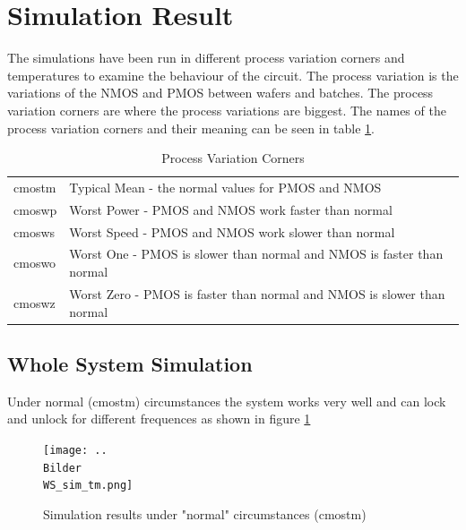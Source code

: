 \documentclass[a4paper,12pt]{article} \usepackage{graphicx}
\begin{document}
\clearpage
\section{Simulation Result}
The simulations have been run in different process variation corners and
temperatures to examine the behaviour of the circuit. The process variation is
the variations of the NMOS and PMOS between wafers and batches. 
The process variation corners are where the process variations are biggest.
The names of the process variation corners and their meaning can be seen in
table \ref{tab:corners}.

\begin{table}[h]
        \centering
        \begin{tabular}{|l|l|}
                \hline 
                cmostm & Typical Mean - the normal values for PMOS and NMOS \\
                cmoswp & Worst Power - PMOS and NMOS work faster than normal \\
                cmosws & Worst Speed - PMOS and NMOS work slower than normal \\
                cmoswo & Worst One - PMOS is slower than normal and NMOS is
                faster than normal \\
                cmoswz & Worst Zero - PMOS is faster than normal and NMOS is
                slower than normal \\
                \hline
        \end{tabular}
        \caption{Process Variation Corners}
        \label{tab:corners}
\end{table}

\subsection{Whole System Simulation}
Under normal (cmostm) circumstances the system works very well and can
lock and unlock for different frequences as shown in figure \ref{fig:WS_sim_tm} 

\begin{figure}[h]
  \centering
  \texttt{[image: ..\\Bilder\\WS\_sim\_tm.png]}
  \caption{Simulation results under "normal" circumstances (cmostm)}
  \label{fig:WS_sim_tm}
\end{figure}
\end{document}
